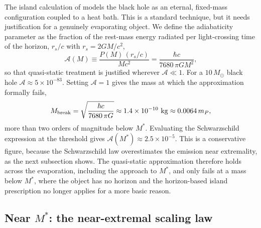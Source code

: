 \documentclass[11pt]{article}
\begin{document}
The island calculation of \citet{KimNam2021} models the black hole as an eternal, fixed-mass configuration coupled to a heat bath. This is a standard technique, but it needs justification for a genuinely evaporating object. We define the adiabaticity parameter as the fraction of the rest-mass energy radiated per light-crossing time of the horizon, $r_s/c$ with $r_s=2GM/c^2$,
\begin{equation}
\mathcal{A}(M)\equiv\frac{P(M)\,(r_s/c)}{Mc^2}=\frac{\hbar c}{7680\,\pi GM^2},
\label{eq:adiabaticity-param}
\end{equation}
so that quasi-static treatment is justified wherever $\mathcal{A}\ll1$. For a $10\,M_\odot$ black hole $\mathcal{A}\approx5\times10^{-83}$. Setting $\mathcal{A}=1$ gives the mass at which the approximation formally fails,
\begin{equation}
M_{\rm break}=\sqrt{\frac{\hbar c}{7680\,\pi G}}\approx1.4\times10^{-10}\ \mathrm{kg}\approx0.0064\,m_P,
\end{equation}
more than two orders of magnitude below $M^*$. Evaluating the Schwarzschild expression at the threshold gives $\mathcal{A}(M^*)\approx2.5\times10^{-5}$. This is a conservative figure, because the Schwarzschild law overestimates the emission near extremality, as the next subsection shows. The quasi-static approximation therefore holds across the evaporation, including the approach to $M^*$, and only fails at a mass below $M^*$, where the object has no horizon and the horizon-based island prescription no longer applies for a more basic reason.

\subsection{Near \texorpdfstring{$M^*$}{M*}: the near-extremal scaling law}
\label{sec:corrected}
\end{document}
